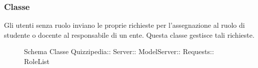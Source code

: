 \subsubsection{Classe }
Gli utenti senza ruolo inviano le proprie richieste per l'assegnazione al ruolo di studente o docente al responsabile di un ente. Questa classe gestisce tali richieste.
\begin{figure}[H]
\centering
\noindent{}
\caption[Schema Classe RoleList]{Schema Classe Quizzipedia:: Server:: ModelServer:: Requests:: RoleList}
\end{figure}
